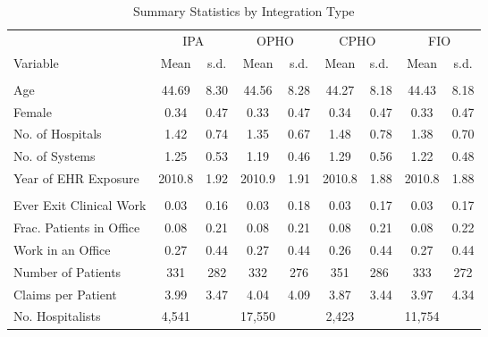 \begin{table}[h]
\centering
\caption{Summary Statistics by Integration Type}
\centering
\begin{tabular}[t]{lccccclcc}
\toprule
\multicolumn{1}{c}{ } & \multicolumn{2}{c}{IPA} & \multicolumn{2}{c}{OPHO} & \multicolumn{2}{c}{CPHO} & \multicolumn{2}{c}{FIO} \\
\cmidrule(l{3pt}r{3pt}){2-3} \cmidrule(l{3pt}r{3pt}){4-5} \cmidrule(l{3pt}r{3pt}){6-7} \cmidrule(l{3pt}r{3pt}){8-9}
Variable & Mean & s.d. & Mean & s.d. & Mean & s.d. & Mean & s.d.\\
\midrule
\addlinespace[0.3em]
\multicolumn{9}{l}{\textbf{Characteristics}}\\
\hspace{1em}Age & 44.69 & 8.30 & 44.56 & 8.28 & 44.27 & 8.18 & 44.43 & 8.18\\
\hspace{1em}Female & 0.34 & 0.47 & 0.33 & 0.47 & 0.34 & 0.47 & 0.33 & 0.47\\
\hspace{1em}No. of Hospitals & 1.42 & 0.74 & 1.35 & 0.67 & 1.48 & 0.78 & 1.38 & 0.70\\
\hspace{1em}No. of Systems & 1.25 & 0.53 & 1.19 & 0.46 & 1.29 & 0.56 & 1.22 & 0.48\\
\hspace{1em}Year of EHR Exposure & 2010.8 & 1.92 & 2010.9 & 1.91 & 2010.8 & 1.88 & 2010.8 & 1.88\\
\addlinespace[0.3em]
\multicolumn{9}{l}{\textbf{Outcomes}}\\
\hspace{1em}Ever Exit Clinical Work & 0.03 & 0.16 & 0.03 & 0.18 & 0.03 & 0.17 & 0.03 & 0.17\\
\hspace{1em}Frac. Patients in Office & 0.08 & 0.21 & 0.08 & 0.21 & 0.08 & 0.21 & 0.08 & 0.22\\
\hspace{1em}Work in an Office & 0.27 & 0.44 & 0.27 & 0.44 & 0.26 & 0.44 & 0.27 & 0.44\\
\hspace{1em}Number of Patients & 331 & 282 & 332 & 276 & 351 & 286 & 333 & 272\\
\hspace{1em}Claims per Patient & 3.99 & 3.47 & 4.04 & 4.09 & 3.87 & 3.44 & 3.97 & 4.34\\
No. Hospitalists & 4,541 &  & 17,550 &  & 2,423 &  & 11,754 & \\
\bottomrule
\end{tabular}\label{tab:int}
\end{table}